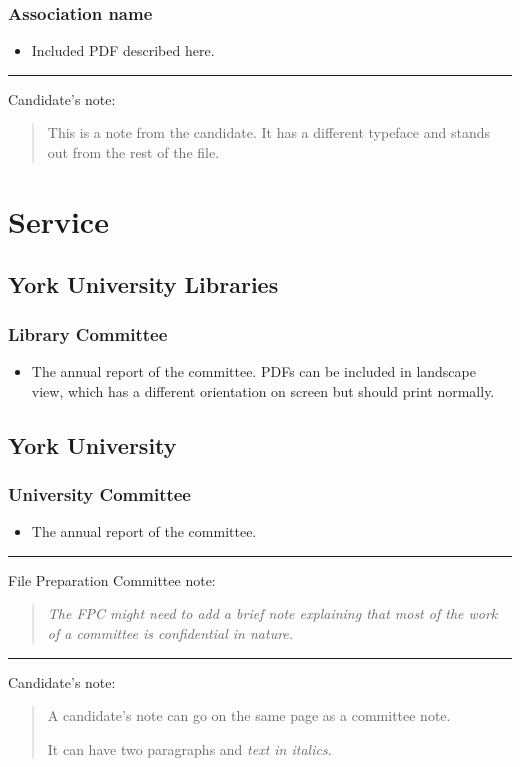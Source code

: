 \documentclass[12pt,oneside]{book}
\newcommand{\candidatenote}[1] {%
\par\noindent\rule{\textwidth}{1pt}
{\large Candidate's note:}
\begin{quote}
  \fontfamily{phv}\selectfont
  {\small #1}
\end{quote}
}
\newcommand{\committeenote}[1] {%
\par\noindent\rule{\textwidth}{1pt}
{\large File Preparation Committee note:}
\begin{quote}
  \itshape{}
  {\small #1}
\end{quote}
}
\begin{document}
\subsection{Association name}

\begin{itemize}
  \item Included PDF described here.
\end{itemize}

\candidatenote{
  This is a note from the candidate.  It has a different typeface and stands out from the rest of the file.
}



\renewcommand\thechapter{C}
\chapter{Service}

\section{York University Libraries}

\subsection{Library Committee}

\begin{itemize}
  \item The annual report of the committee.  PDFs can be included in landscape view, which has a different orientation on screen but should print normally.
\end{itemize}



\section{York University}

\subsection{University Committee}

\begin{itemize}
  \item The annual report of the committee.
\end{itemize}

\committeenote{The FPC might need to add a brief note explaining that most of the work of a committee is confidential in nature.}

\candidatenote{A candidate's note can go on the same page as a committee note.

It can have two paragraphs and \textit{text in italics}.}


\end{document}
